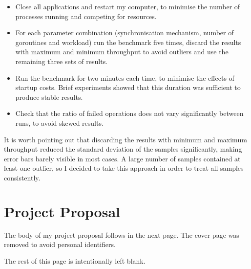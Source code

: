 \documentclass[12pt,a4paper,oneside,openright]{report}
\begin{document}
\begin{itemize}
\item Close all applications and restart my computer, to minimise the
  number of processes running and competing for resources.
\item For each parameter combination (synchronisation mechanism,
  number of goroutines and workload) run the benchmark five times,
  discard the results with maximum and minimum throughput to avoid
  outliers and use the remaining three sets of results.
\item Run the benchmark for two minutes each time, to minimise the
  effects of startup costs. Brief experiments showed that this
  duration was sufficient to produce stable results.
\item Check that the ratio of failed operations does not vary
  significantly between runs, to avoid skewed results.
\end{itemize}
It is worth pointing out that discarding the results with minimum and
maximum throughput reduced the standard deviation of the samples
significantly, making error bars barely visible in most cases. A large
number of samples contained at least one outlier, so I decided to take
this approach in order to treat all samples consistently.

\chapter{Project Proposal}
\label{cha:project-proposal}

The body of my project proposal follows in the next page. The cover
page was removed to avoid personal identifiers.

The rest of this page is intentionally left blank.
\end{document}
